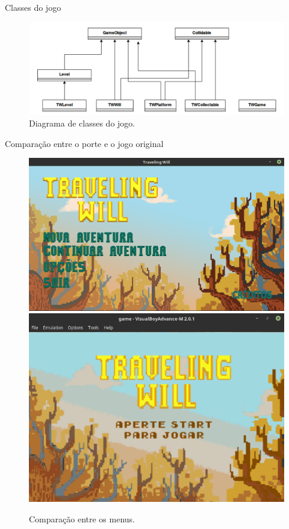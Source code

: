 \documentclass[notes, mathserif]{beamer}
\begin{document}
\begin{frame}{Classes do jogo}
	\begin{figure}[H]
		\includegraphics[width=1\linewidth]{figuras/classes.png}
		\centering
		\caption{Diagrama de classes do jogo.}
		\label{fig:vsync}
	\end{figure}
\end{frame}

\begin{frame}{Compara\c c\~ao entre o porte e o jogo original}
	\begin{figure}%
    \includegraphics[width=.5\linewidth]{figuras/pc-menu.png}
    \qquad
    \includegraphics[width=.4\linewidth]{figuras/gba-menu.png}
    \caption{Compara\c c\~ao entre os menus.}%
    \label{fig:comp1}%
	\end{figure}
\end{frame}
\end{document}
